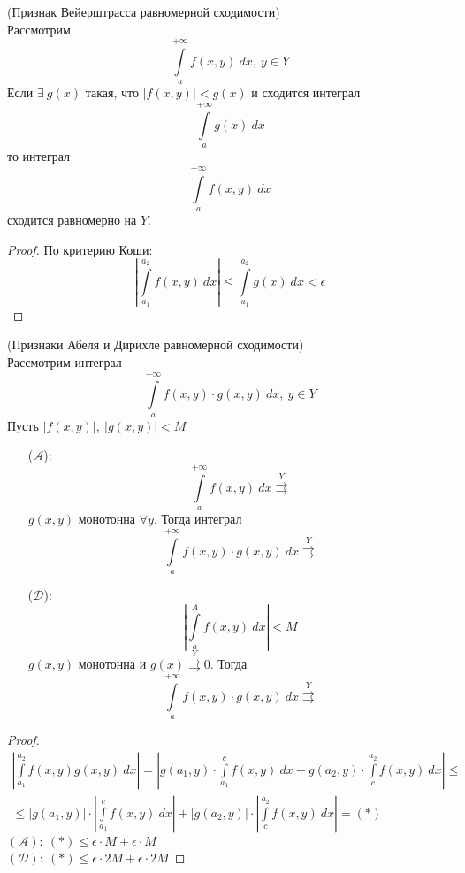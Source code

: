 \begin{theorem} (Признак Вейерштрасса равномерной сходимости)\\
    Рассмотрим
    \[\int\limits_{a}^{+\infty}f(x,y)\ dx,\ y\in Y\]
    Если $\exists\ g(x)$ такая, что $|f(x,y)|<g(x)$ и сходится интеграл
    \[\int\limits_{a}^{+\infty}g(x)\ dx\]
    то интеграл 
    \[\int\limits_{a}^{+\infty}f(x,y)\ dx\]
    сходится равномерно на $Y$.
\end{theorem}
\begin{proof}
    По критерию Коши:
    \[\left|\int\limits_{a_1}^{a_2}f(x,y)\ dx\right|\leq \int\limits_{a_1}^{a_2}g(x)\ dx<\epsilon\]
\end{proof}
\begin{theorem} (Признаки Абеля и Дирихле равномерной сходимости)\\
    Рассмотрим интеграл
    \[\int\limits_{a}^{+\infty}f(x,y)\cdot g(x,y)\ dx,\ y\in Y\]
    Пусть $|f(x,y)|,\ |g(x,y)|<M$
    \begin{itemize}
        \item[($\mathcal{A}$):] 
        \[\int\limits_{a}^{+\infty}f(x,y)\ dx \overset{Y}{\rightrightarrows}\]
        $g(x,y)$ монотонна $\forall y$. Тогда интеграл
        \[\int\limits_{a}^{+\infty}f(x,y)\cdot g(x,y)\ dx\overset{Y}{\rightrightarrows}\]
        \item[($\mathcal{D}$):]
        \[\left|\int\limits_{a}^{A}f(x,y)\ dx\right|<M\]
        $g(x,y)$ монотонна и $g(x)\overset{Y}{\rightrightarrows}0$. Тогда
        \[\int\limits_{a}^{+\infty}f(x,y)\cdot g(x,y)\ dx\overset{Y}{\rightrightarrows}\]
    \end{itemize}
\end{theorem}
\begin{proof} %
    \begin{multline*}
        \left|\int\limits_{a_1}^{a_2}f(x,y)g(x,y)\ dx\right|=\left|g(a_1,y)\cdot \int\limits_{a_1}^{c}f(x,y)\ dx+ g(a_2,y)\cdot \int\limits_{c}^{a_2}f(x,y)\ dx\right|\leq \\
        \leq |g(a_1,y)|\cdot \left|\int\limits_{a_1}^{c}f(x,y)\ dx \right|+|g(a_2,y)|\cdot \left|\int\limits_{c}^{a_2}f(x,y)\ dx\right|=(*)
    \end{multline*}
    $(\mathcal{A}):\ (*)\leq \epsilon\cdot M+\epsilon\cdot M$\\
    $(\mathcal{D}):\ (*)\leq \epsilon\cdot 2M+\epsilon\cdot 2M$
\end{proof}